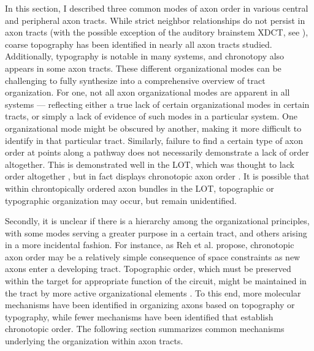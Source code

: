 In this section, I described three common modes of axon order in various central and peripheral axon tracts.
While strict neighbor relationships do not persist in axon tracts (with the possible exception of the auditory brainstem XDCT, see ), coarse topography has been identified in nearly all axon tracts studied.
Additionally, typography is notable in many systems, and chronotopy also appears in some axon tracts.
These different organizational modes can be challenging to fully synthesize into a comprehensive overview of tract organization.
For one, not all axon organizational modes are apparent in all systems --- reflecting either a true lack of certain organizational modes in certain tracts, or simply a lack of evidence of such modes in a particular system.
One organizational mode might be obscured by another, making it more difficult to identify in that particular tract.
Similarly, failure to find a certain type of axon order at points along a pathway does not necessarily demonstrate a lack of order altogether.
This is demonstrated well in the LOT, which was thought to lack order altogether \cite{price1975observation}, but in fact displays chronotopic axon order \cite{yamatani2004chronotopic}.
It is possible that within chrontopically ordered axon bundles in the LOT, topographic or typographic organization may occur, but remain unidentified.

Secondly, it is unclear if there is a hierarchy among the organizational principles, with some modes serving a greater purpose in a certain tract, and others arising in a more incidental fashion.
For instance, as Reh et al.  propose, chronotopic axon order may be a relatively simple consequence of space constraints as new axons enter a developing tract.
Topographic order, which must be preserved within the target for appropriate function of the circuit, might be maintained in the tract by more active organizational elements \cite{reh1983organization}.
To this end, more molecular mechanisms have been identified in organizing axons based on topography or typography, while fewer mechanisms have been identified that establish chronotopic order.
The following section summarizes common mechanisms underlying the organization within axon tracts.